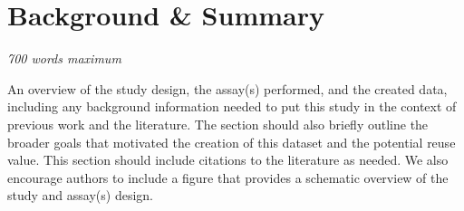 \section{Background & Summary} 
\textit{700 words maximum}

An overview of the study design, the assay(s) performed, and the created data, including any background information needed to put this study in the context of previous work and the literature. The section should also briefly outline the broader goals that motivated the creation of this dataset and the potential reuse value.  This section should include citations to the literature as needed.  We also encourage authors to include a figure that provides a schematic overview of the study and assay(s) design. 
